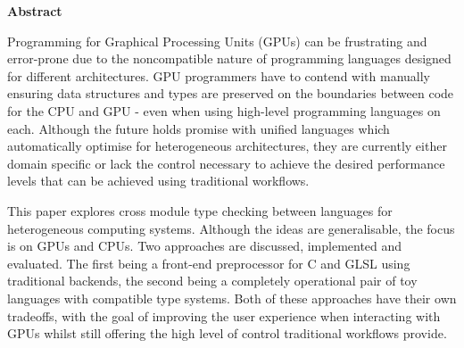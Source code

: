 \newpage
{\Huge \bf Abstract}
\vspace{24pt}



Programming for Graphical Processing Units (GPUs) can be frustrating and
error-prone due to the noncompatible nature of programming languages designed
for different architectures. GPU programmers have to contend with manually
ensuring data structures and types are preserved on the boundaries between code
for the CPU and GPU - even when using high-level programming languages on each.
Although the future holds promise with unified languages which automatically
optimise for heterogeneous architectures, they are currently either domain
specific or lack the control necessary to achieve the desired performance
levels that can be achieved using traditional workflows.

This paper explores cross module type checking between languages for
heterogeneous computing systems. Although the ideas are generalisable, the
focus is on GPUs and CPUs. Two approaches are discussed, implemented and
evaluated. The first being a front-end preprocessor for C and GLSL using
traditional backends, the second being a completely operational pair of toy
languages with compatible type systems. Both of these approaches have their own
tradeoffs, with the goal of improving the user experience when interacting with
GPUs whilst still offering the high level of control traditional workflows
provide.

\newpage
\vspace*{\fill}
